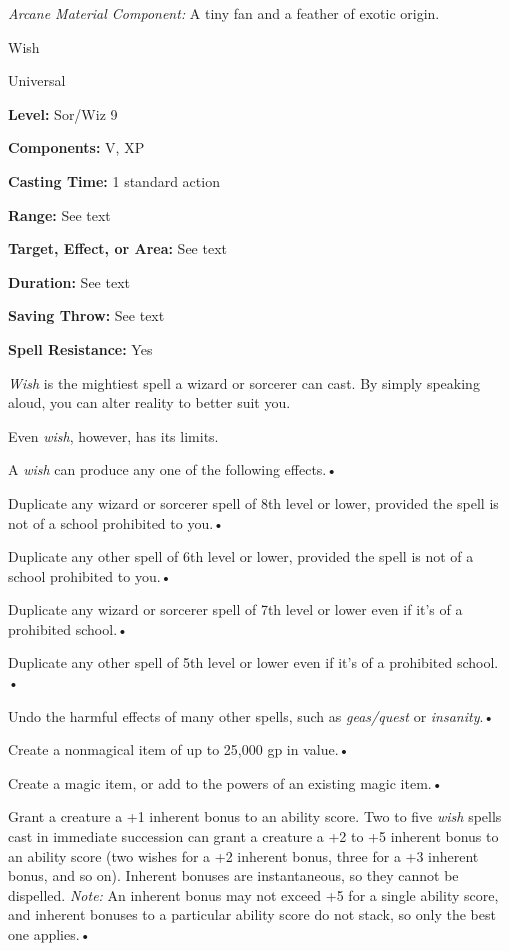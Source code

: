 \documentclass{article}
\begin{document}
\textit{Arcane Material Component: }A tiny fan and a feather of exotic origin.

\vspace{12pt}
Wish

Universal

\textbf{Level:} Sor/Wiz 9

\textbf{Components:} V, XP

\textbf{Casting Time:} 1 standard action

\textbf{Range:} See text

\textbf{Target, Effect, or Area:} See text

\textbf{Duration:} See text

\textbf{Saving Throw:} See text

\textbf{Spell Resistance:} Yes

\textit{Wish }is the mightiest spell a wizard or sorcerer can cast. By simply speaking 
aloud, you can alter reality to better suit you.

Even \textit{wish}, however, has its limits.

A \textit{wish }can produce any one of the following effects.• 

Duplicate any wizard or sorcerer spell of 8th level or lower, provided the spell 
is not of a school prohibited to you.• 

Duplicate any other spell of 6th level or lower, provided the spell is not of a 
school prohibited to you.• 

Duplicate any wizard or sorcerer spell of 7th level or lower even if it's of a 
prohibited school.• 

Duplicate any other spell of 5th level or lower even if it's of a prohibited school. 
• 

Undo the harmful effects of many other spells, such as \textit{geas/quest }or \textit{insanity}.• 

Create a nonmagical item of up to 25,000 gp in value.• 

Create a magic item, or add to the powers of an existing magic item.• 

Grant a creature a +1 inherent bonus to an ability score. Two to five \textit{wish 
}spells cast in immediate succession can grant a creature a +2 to +5 inherent bonus 
to an ability score (two wishes for a +2 inherent bonus, three for a +3 inherent 
bonus, and so on). Inherent bonuses are instantaneous, so they cannot be dispelled. 
\textit{Note: }An inherent bonus may not exceed +5 for a single ability score, 
and inherent bonuses to a particular ability score do not stack, so only the best 
one applies.• 
\end{document}
